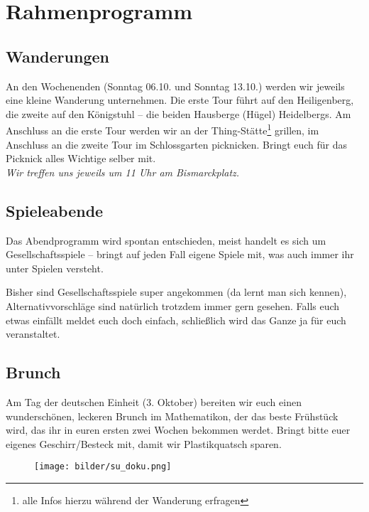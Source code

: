 \section{Rahmenprogramm}
\subsection{Wanderungen}
An den Wochenenden (Sonntag 06.10. und Sonntag 13.10.) werden wir jeweils eine kleine Wanderung unternehmen. Die erste Tour führt auf den Heiligenberg, die zweite auf den Königstuhl -- die beiden Hausberge (Hügel) Heidelbergs. Am Anschluss an die erste Tour werden wir an der Thing-Stätte\footnote{alle Infos hierzu während der Wanderung erfragen} grillen, im Anschluss an die zweite Tour im Schlossgarten picknicken. Bringt euch für das Picknick alles Wichtige selber mit.\\

\noindent\emph{Wir treffen uns jeweils um 11 Uhr am Bismarckplatz.}

\vfill


\eject

\subsection{Spieleabende}
Das Abendprogramm wird spontan entschieden, meist handelt es sich um Gesellschaftsspiele -- bringt auf jeden Fall eigene Spiele mit, was auch immer ihr unter Spielen versteht.

Bisher sind Gesellschaftsspiele super angekommen (da lernt man sich kennen), Alternativvorschläge sind natürlich trotzdem immer gern gesehen. Falls euch etwas einfällt meldet euch doch einfach, schließlich wird das Ganze ja für euch veranstaltet.

\subsection{Brunch}
Am Tag der deutschen Einheit (3. Oktober) bereiten wir euch einen wunderschönen, leckeren Brunch im \gls{Mathematikon}, der das beste Frühstück wird, das ihr in euren ersten zwei Wochen bekommen werdet. Bringt bitte euer eigenes Geschirr/Besteck mit, damit wir Plastikquatsch sparen.

\vspace{4cm}

\begin{figure}[h]
\centering
\texttt{[image: bilder/su\_doku.png]}
\end{figure}

